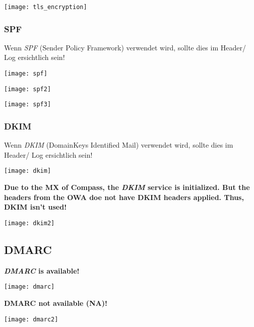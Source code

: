 \begin{center}
    \texttt{[image: tls\_encryption]}
\end{center}

\subsubsection{SPF}
Wenn \textit{SPF} (Sender Policy Framework) verwendet wird, sollte dies im Header/ Log ersichtlich sein!
\begin{center}
    \texttt{[image: spf]}
\end{center}
\texttt{[image: spf2]}
\begin{center}
    \texttt{[image: spf3]}
\end{center}

\newpage

\subsubsection{DKIM}
Wenn \textit{DKIM} (DomainKeys Identified Mail) verwendet wird, sollte dies im Header/ Log ersichtlich sein!

\begin{center}
    \texttt{[image: dkim]}
\end{center}

\textbf{Due to the MX of Compass, the \textit{DKIM} service is initialized. But the headers from the OWA doe not have DKIM headers applied. Thus, DKIM isn't used!}

\begin{center}
    \texttt{[image: dkim2]}
\end{center}

\subsection{DMARC}
\textbf{\textit{DMARC} is available!}

\begin{center}
    \texttt{[image: dmarc]}
\end{center}

\textbf{DMARC not available (NA)!}
\begin{center}
    \texttt{[image: dmarc2]}
\end{center}

\newpage

